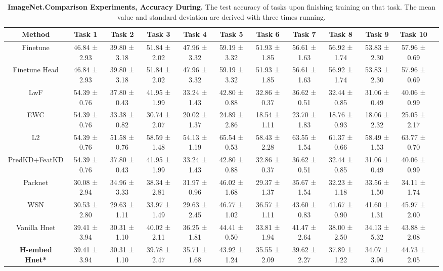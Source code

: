 \begin{sidewaystable}[ht]
\centering
\renewcommand{\arraystretch}{1.6}
\setlength{\tabcolsep}{0.9\tabcolsep}
\begin{adjustbox}{max width=\textwidth}
\begin{tabular}{|c|c|c|c|c|c|c|c|c|c|c|c|}
\hline
Method & Task 1 &  Task 2 & Task 3 & Task 4 & Task 5 & Task 6 & Task 7 & Task 8 & Task 9 & Task 10 \\
\hline
Finetune& 46.84 ± 2.93 & 39.80 ± 3.18 & 51.84 ± 2.02 & 47.96 ± 3.32 & 59.19 ± 3.32 & 51.93 ± 1.85 & 56.61 ± 1.63 & 56.92 ± 1.74 & 53.83 ± 2.30 & 57.96 ± 0.69  \\
\hline
Finetune Head & 46.84 ± 2.93 & 39.80 ± 3.18 & 51.84 ± 2.02 & 47.96 ± 3.32 & 59.19 ± 3.32 & 51.93 ± 1.85 & 56.61 ± 1.63 & 56.92 ± 1.74 & 53.83 ± 2.30 & 57.96 ± 0.69 \\
\hline
LwF &54.39 ± 0.76 & 37.80 ± 0.43 & 41.95 ± 1.99 & 33.24 ± 1.43 & 42.80 ± 0.88 & 32.86 ± 0.37 & 36.62 ± 0.51 & 32.44 ± 0.85 & 31.06 ± 0.49 & 40.06 ± 0.99\\
\hline
EWC & 54.39 ± 0.76 & 33.38 ± 0.82 & 30.74 ± 2.07 & 20.02 ± 1.37 & 24.89 ± 2.86 & 18.54 ± 1.11 & 23.70 ± 1.83 & 18.76 ± 0.93 & 18.06 ± 2.32 & 25.05 ± 2.17 \\
\hline
L2 & 54.39 ± 0.76 & 51.58 ± 0.76 & 58.59 ± 1.48 & 54.13 ± 1.19 & 65.54 ± 0.53 & 58.43 ± 2.28 & 63.55 ± 1.54 & 61.37 ± 0.66 & 58.49 ± 1.53 & 63.77 ± 0.70 \\
\hline
PredKD+FeatKD & 54.39 ± 0.76 & 37.80 ± 0.43 & 41.95 ± 1.99 & 33.24 ± 1.43 & 42.80 ± 0.88 & 32.86 ± 0.37 & 36.62 ± 0.51 & 32.44 ± 0.85 & 31.06 ± 0.49 & 40.06 ± 0.99 \\
\hline
Packnet & 30.08 ± 2.94 & 34.96 ± 3.33 & 38.34 ± 2.81 & 31.97 ± 0.96 & 46.02 ± 1.68 & 29.37 ± 1.37 & 35.67 ± 1.54 & 32.23 ± 1.18 & 33.56 ± 1.50 & 34.11 ± 1.74 \\
\hline
WSN & 30.53 ± 2.80 & 29.63 ± 1.11 & 33.97 ± 1.49 & 29.63 ± 2.45 & 46.77 ± 1.02 & 36.57 ± 1.11 & 43.60 ± 0.83 & 41.67 ± 0.90 & 41.60 ± 1.31 & 45.97 ± 2.00 \\
\hline
Vanilla Hnet & 39.41 ± 3.94 & 30.31 ± 1.10 & 40.02 ± 2.11 & 36.25 ± 1.81 & 44.41 ± 0.50 & 33.81 ± 1.94 & 41.47 ± 2.64 & 38.00 ± 2.50 & 34.13 ± 5.32 & 43.88 ± 2.08 \\
\hline
\textbf{H-embed Hnet*} & 39.41 ± 3.94 & 30.31 ± 1.10 & 39.78 ± 2.47 & 35.71 ± 1.68 & 43.92 ± 1.24 & 35.55 ± 2.09 & 39.62 ± 2.27 & 37.89 ± 1.22 & 34.07 ± 3.96 & 44.73 ± 2.05 \\

\hline
\end{tabular}
\end{adjustbox}
\caption{\textbf{ImageNet.Comparison Experiments, Accuracy During.} The test accuracy of tasks upon finishing training on that task. The mean value and standard deviation are derived with three times running.}
\end{sidewaystable}


